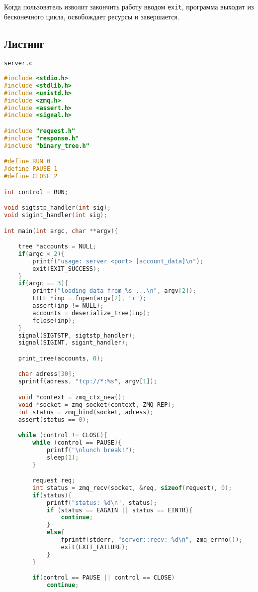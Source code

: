 \documentclass[12pt]{article}
\begin{document}
Когда пользователь изволит закончить работу вводом \verb|exit|, программа выходит из бесконечного цикла, освобождает ресурсы и завершается.

\subsection*{Листинг}
\verb|server.c|
\begin{lstlisting}[language=C, basicstyle=\scriptsize]
#include <stdio.h>
#include <stdlib.h>
#include <unistd.h>
#include <zmq.h>
#include <assert.h>
#include <signal.h>

#include "request.h"
#include "response.h"
#include "binary_tree.h"

#define RUN 0
#define PAUSE 1
#define CLOSE 2

int control = RUN;

void sigtstp_handler(int sig);
void sigint_handler(int sig);

int main(int argc, char **argv){

    tree *accounts = NULL;
    if(argc < 2){
        printf("usage: server <port> [account_data]\n");
        exit(EXIT_SUCCESS);
    }
    if(argc == 3){
        printf("loading data from %s ...\n", argv[2]);
        FILE *inp = fopen(argv[2], "r"); 
        assert(inp != NULL);
        accounts = deserialize_tree(inp);
        fclose(inp);
    }
    signal(SIGTSTP, sigtstp_handler);
    signal(SIGINT, sigint_handler);

    print_tree(accounts, 0);

    char adress[30];
    sprintf(adress, "tcp://*:%s", argv[1]);

    void *context = zmq_ctx_new();
    void *socket = zmq_socket(context, ZMQ_REP);
    int status = zmq_bind(socket, adress);
    assert(status == 0);

    while (control != CLOSE){
        while (control == PAUSE){
            printf("\nlunch break!");
            sleep(1);
        }

        request req;
        int status = zmq_recv(socket, &req, sizeof(request), 0);
        if(status){
            printf("status: %d\n", status);
            if (status == EAGAIN || status == EINTR){
                continue;
            }
            else{
                fprintf(stderr, "server::recv: %d\n", zmq_errno());
                exit(EXIT_FAILURE);
            }
        }

        if(control == PAUSE || control == CLOSE)
            continue;


\end{lstlisting}
\end{document}
